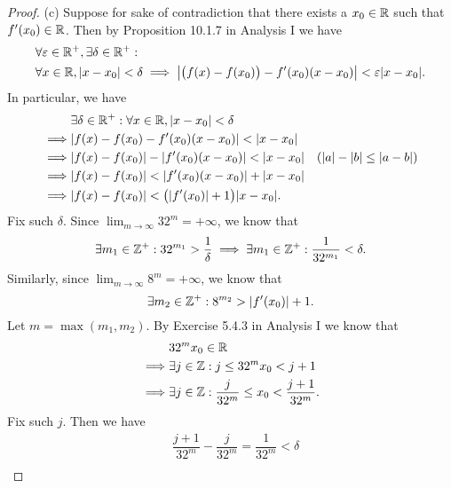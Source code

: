 \begin{proof}{(c)}
  Suppose for sake of contradiction that there exists a \(x_0 \in \mathbb{R}\) such that \(f'(x_0) \in \mathbb{R}\).
  Then by Proposition 10.1.7 in Analysis I we have
  \begin{align*}
     & \forall \varepsilon \in \R^+, \exists \delta \in \R^+ :                                                                          \\
     & \forall x \in \R, \abs{x - x_0} < \delta \implies \abs{\big(f(x) - f(x_0)\big) - f'(x_0) (x - x_0)} < \varepsilon \abs{x - x_0}.
  \end{align*}
  In particular, we have
  \begin{align*}
             & \exists \delta \in \R^+ : \forall x \in \R, \abs{x - x_0} < \delta                                        \\
    \implies & \abs{f(x) - f(x_0) - f'(x_0) (x - x_0)} < \abs{x - x_0}                                                   \\
    \implies & \abs{f(x) - f(x_0)} - \abs{f'(x_0) (x - x_0)} < \abs{x - x_0}      & (\abs{a} - \abs{b} \leq \abs{a - b}) \\
    \implies & \abs{f(x) - f(x_0)} < \abs{f'(x_0) (x - x_0)} + \abs{x - x_0}                                             \\
    \implies & \abs{f(x) - f(x_0)} < \big(\abs{f'(x_0)} + 1\big) \abs{x - x_0}.
  \end{align*}
  Fix such \(\delta\).
  Since \(\lim_{m \to \infty} 32^m = +\infty\), we know that
  \[
    \exists m_1 \in \mathbb{Z}^+ : 32^{m_1} > \dfrac{1}{\delta} \implies \exists m_1 \in \mathbb{Z}^+ : \dfrac{1}{32^{m_1}} < \delta.
  \]
  Similarly, since \(\lim_{m \to \infty} 8^m = +\infty\), we know that
  \[
    \exists m_2 \in \mathbb{Z}^+ : 8^{m_2} > \left\lvert f'(x_0)\right\rvert + 1.
  \]
  Let \(m = \max(m_1, m_2)\).
  By Exercise 5.4.3 in Analysis I we know that
  \begin{align*}
             & 32^m x_0 \in \mathbb{R}                                                    \\
    \implies & \exists j \in \mathbb{Z} : j \leq 32^m x_0 < j + 1                         \\
    \implies & \exists j \in \mathbb{Z} : \dfrac{j}{32^m} \leq x_0 < \dfrac{j + 1}{32^m}.
  \end{align*}
  Fix such \(j\).
  Then we have
  \begin{align*}
             & \dfrac{j + 1}{32^m} - \dfrac{j}{32^m} = \dfrac{1}{32^m} < \delta                                                                               \\

\end{align*}
\end{proof}
